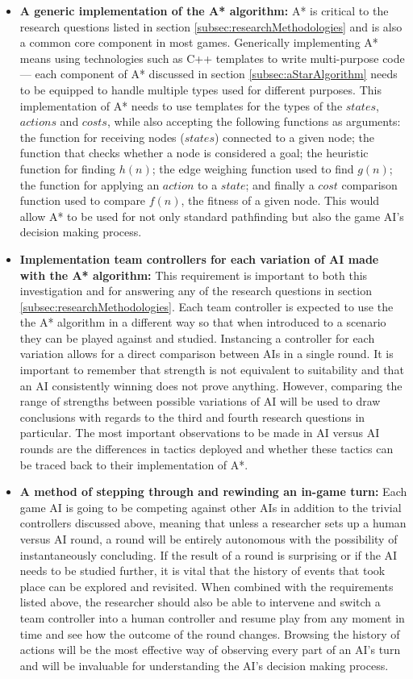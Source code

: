 \documentclass[11pt, a4paper]{report}
\begin{document}
\begin{itemize}
\item \textbf{A generic implementation of the A* algorithm:}
A* is critical to the research questions listed in section \ref{subsec:researchMethodologies} and is also a common core component in most games. Generically implementing A* means using technologies such as C++ templates to write multi-purpose code --- each component of A* discussed in section \ref{subsec:aStarAlgorithm} needs to be equipped to handle multiple types used for different purposes. This implementation of A* needs to use templates for the types of the $states$, $actions$ and $costs$, while also accepting the following functions as arguments: the function for receiving nodes ($states$) connected to a given node; the function that checks whether a node is considered a goal; the heuristic function for finding $h(n)$; the edge weighing function used to find $g(n)$; the function for applying an $action$ to a $state$; and finally a $cost$ comparison function used to compare $f(n)$, the fitness of a given node. This would allow A* to be used for not only standard pathfinding but also the game AI's decision making process.

\item \textbf{Implementation team controllers for each variation of AI made with the A* algorithm:}
This requirement is important to both this investigation and for answering any of the research questions in section \ref{subsec:researchMethodologies}. Each team controller is expected to use the the A* algorithm in a different way so that when introduced to a scenario they can be played against and studied. Instancing a controller for each variation allows for a direct comparison between AIs in a single round. It is important to remember that strength is not equivalent to suitability and that an AI consistently winning does not prove anything. However, comparing the range of strengths between possible variations of AI will be used to draw conclusions with regards to the third and fourth research questions in particular. The most important observations to be made in AI versus AI rounds are the differences in tactics deployed and whether these tactics can be traced back to their implementation of A*.

\item \textbf{A method of stepping through and rewinding an in-game turn:}
Each game AI is going to be competing against other AIs in addition to the trivial controllers discussed above, meaning that unless a researcher sets up a human versus AI round, a round will be entirely autonomous with the possibility of instantaneously concluding. If the result of a round is surprising or if the AI needs to be studied further, it is vital that the history of events that took place can be explored and revisited. When combined with the requirements listed above, the researcher should also be able to intervene and switch a team controller into a human controller and resume play from any moment in time and see how the outcome of the round changes. Browsing the history of actions will be the most effective way of observing every part of an AI's turn and will be invaluable for understanding the AI's decision making process.

\end{itemize}
\end{document}
